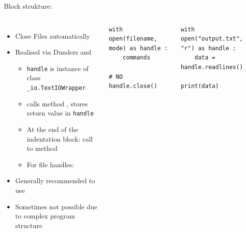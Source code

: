 \begin{frame}[fragile]{Block strukture: }
%
\begin{columns}[T]
\begin{itemize}
\item Close Files automatically
\item Realised via Dunders  and 
	\begin{itemize}
	\item \texttt{handle} is instance of class \texttt{\_io.TextIOWrapper}
	\item {} calls method , stores return value in \texttt{handle}
	\item At the end of the indentation block: call to method 
	\item For file handles: 
	\end{itemize}
\item Generally recommended to use
\item Sometimes not possible due to complex program structure
\end{itemize}
%
\begin{codebox}
\begin{verbatim}
with open(filename, mode) as handle :
    commands

# NO handle.close()
\end{verbatim}
\end{codebox}
%
\begin{codebox}
\begin{verbatim}
with open("output.txt", "r") as handle :
    data = handle.readlines()
    
print(data)
\end{verbatim}
\end{codebox}
%
\end{columns}
%
\end{frame}


